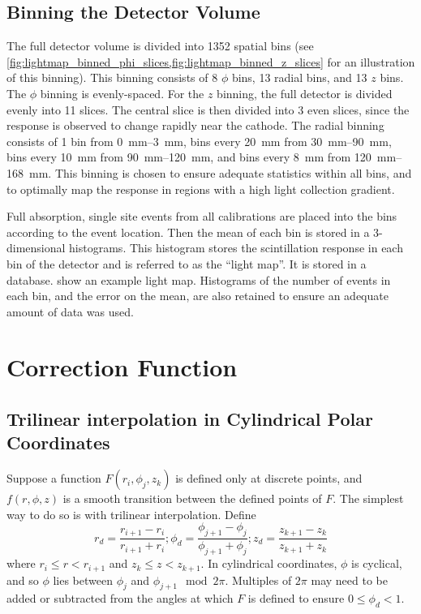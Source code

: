 \documentclass[herrin-thesis.tex]{subfiles}
\begin{document}
\subsection{Binning the Detector Volume}

The full detector volume is divided into 1352 spatial bins (see \cref{fig:lightmap_binned_phi_slices,fig:lightmap_binned_z_slices} for an illustration of this binning). This binning consists of 8 \(\phi\) bins, 13 radial bins, and 13 \(z\) bins. The \(\phi\) binning is evenly-spaced. For the \(z\) binning, the full detector is divided evenly into 11 slices. The central slice is then divided into 3 even slices, since the response is observed to change rapidly near the cathode. The radial binning consists of 1 bin from \SIrange{0}{3}{\mm}, bins every \SI{20}{mm} from \SIrange{30}{90}{\mm}, bins every \SI{10}{\mm} from \SIrange{90}{120}{\mm}, and bins every \SI{8}{mm} from \SIrange{120}{168}{\mm}. This binning is chosen to ensure adequate statistics within all bins, and to optimally map the response in regions with a high light collection gradient.

Full absorption, single site events from all calibrations are placed into the bins according to the event location. Then the mean of each bin is stored in a 3-dimensional histograms. This histogram stores the scintillation response in each bin of the detector and is referred to as the ``light map''. It is stored in a database.  show an example light map. Histograms of the number of events in each bin, and the error on the mean, are also retained to ensure an adequate amount of data was used.

\section{Correction Function}

\subsection{Trilinear interpolation in Cylindrical Polar Coordinates}
Suppose a function \(F(r_i, \phi_j, z_k)\) is defined only at discrete points, and \(f(r, \phi, z)\) is a smooth transition between the defined points of \(F\). The simplest way to do so is with trilinear interpolation. Define
\begin{equation}
r_d = \frac{r_{i+1} - r_{i}}{r_{i+1}+r_{i}} ; \phi_d = \frac{\phi_{j+1} - \phi_{j}}{\phi_{j+1}+\phi_{j}}; z_d = \frac{z_{k+1} - z_{k}}{z_{k+1}+z_{k}}
\label{eq:lightmap_interpolation_weights}
\end{equation}
where \(r_i \leq r < r_{i+1}\) and \(z_k \leq z < z_{k+1}\). In cylindrical coordinates, \(\phi\) is cyclical, and so \(\phi\) lies between \(\phi_j\) and \(\phi_{j+1} \mod 2\pi\). Multiples of \(2\pi\) may need to be added or subtracted from the angles at which \(F\) is defined to ensure \(0 \leq \phi_d < 1\).
\end{document}
